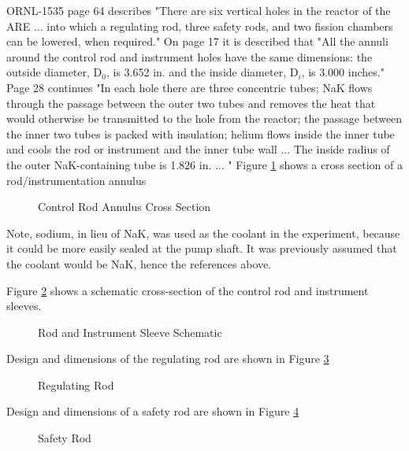 \documentclass[ms,a4paper]{memoir}
\newcommand*{\msrarchive}{../../msr-archive}%
\begin{document}
ORNL-1535 page 64 describes "There are six vertical holes in the reactor of the ARE ... into which a regulating rod, three safety rods, and two fission chambers can be lowered, when required." On page 17 it is described that "All the annuli around the control rod and instrument holes have the same dimensions: the outside diameter, D$_0$, is 3.652 in. and the inside diameter, D$_i$, is 3.000 inches." Page 28 continues "In each hole there are three concentric tubes; NaK flows through the passage between the outer two tubes and removes the heat that would otherwise be transmitted to the hole from the reactor; the passage between the inner two tubes is packed with insulation; helium flows inside the inner tube and cools the rod or instrument and the inner tube wall ... The inside radius of the outer NaK-containing tube is 1.826 in. ... " Figure \ref{fig8} shows a cross section of a rod/instrumentation annulus

\begin{figure}[H]
  \centering
  \caption{Control Rod Annulus Cross Section \parencite[Fig 17]{ornl-1535}}
  \label{fig8}
\end{figure}

Note, sodium, in lieu of NaK, was used as the coolant in the experiment, because it could be more easily sealed at the pump shaft. It was previously assumed that the coolant would be NaK, hence the references above.

Figure \ref{fig12} shows a schematic cross-section of the control rod and instrument sleeves.

\begin{figure}[H]
  \centering
  \caption{Rod and Instrument Sleeve Schematic \parencite[Fig 42]{ornl-1535}}
  \label{fig12}
\end{figure}

Design and dimensions of the regulating rod are shown in Figure \ref{fig13}

\begin{figure}[H]
  \centering
  \caption{Regulating Rod \parencite[Fig 47]{ornl-1535}}
  \label{fig13}
\end{figure}

Design and dimensions of a safety rod are shown in Figure \ref{fig14}

\begin{figure}[H]
  \centering
  \caption{Safety Rod \parencite[Fig 56]{ornl-1535}}
  \label{fig14}
\end{figure}

\printbibliography
\end{document}
